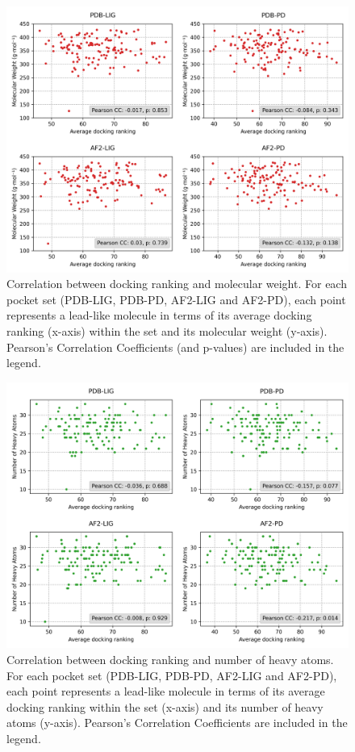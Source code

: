 \begin{figure}[htbp]
  \centering
  \includegraphics[width=0.9\linewidth]{figures/PocketVec/Supplementary/FigS20.png}
  \caption{
  Correlation between docking ranking and molecular weight. For each pocket set (PDB-LIG, PDB-PD, AF2-LIG and AF2-PD), each point represents a lead-like molecule in terms of its average docking ranking (x-axis) within the set and its molecular weight (y-axis). Pearson’s Correlation Coefficients (and p-values) are included in the legend.     
  }
  \label{PocketVec_FigS20}
\end{figure}

\begin{figure}[htbp]
  \centering
  \includegraphics[width=0.9\linewidth]{figures/PocketVec/Supplementary/FigS21.png}
  \caption{
  Correlation between docking ranking and number of heavy atoms. For each pocket set (PDB-LIG, PDB-PD, AF2-LIG and AF2-PD), each point represents a lead-like molecule in terms of its average docking ranking within the set (x-axis) and its number of heavy atoms (y-axis). Pearson’s Correlation Coefficients are included in the legend.      
  }
  \label{PocketVec_FigS21}
\end{figure}


